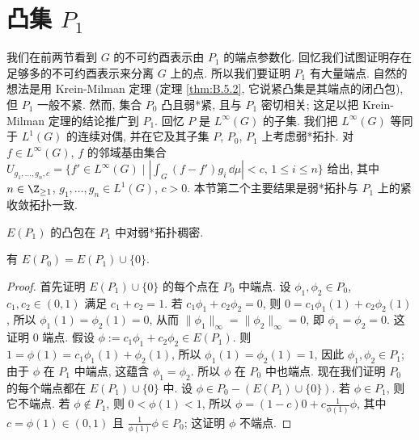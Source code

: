 \section{\texorpdfstring{凸集 $P_1$}{凸集 P1}}
我们在前两节看到 $G$ 的不可约酉表示由 $P_1$ 的端点参数化. 回忆我们试图证明存在足够多的不可约酉表示来分离 $G$ 上的点. 所以我们要证明 $P_1$ 有大量端点. 自然的想法是用 Krein-Milman 定理 (定理 \ref{thm:B.5.2}, 它说紧凸集是其端点的闭凸包), 但 $P_1$ 一般不紧. 然而, 集合 $P_0$ 凸且弱*紧, 且与 $P_1$ 密切相关; 这足以把 Krein-Milman 定理的结论推广到 $P_1$.
回忆 $P$ 是 $L^{\infty}(G)$ 的子集. 我们把 $L^{\infty}(G)$ 等同于 $L^1(G)$ 的连续对偶, 并在它及其子集 $P$, $P_0$, $P_1$ 上考虑弱*拓扑. 对 $f \in L^{\infty}(G)$, $f$ 的邻域基由集合 $U_{g_1,\ldots,g_n,c} = \{f' \in L^{\infty}(G) \mid |\int_G (f - f')g_i\,\dd\mu| < c,\, 1 \leq i \leq n\}$ 给出, 其中 $n \in \Z_{\geq 1}$, $g_1, \ldots, g_n \in L^1(G)$, $c > 0$. 本节第二个主要结果是弱*拓扑与 $P_1$ 上的紧收敛拓扑一致.

\begin{theorem}[$E(P_1)$ 的凸包稠密]
\label{thm:III.4.1}
$E(P_1)$ 的凸包在 $P_1$ 中对弱*拓扑稠密.
\end{theorem}

\begin{lemma}[$E(P_0) = E(P_1) \cup \{0\}$]
\label{lem:III.4.2}
有 $E(P_0) = E(P_1) \cup \{0\}$.
\end{lemma}

\begin{proof}
首先证明 $E(P_1) \cup \{0\}$ 的每个点在 $P_0$ 中端点. 设 $\phi_1, \phi_2 \in P_0$, $c_1, c_2 \in (0, 1)$ 满足 $c_1 + c_2 = 1$. 若 $c_1\phi_1 + c_2\phi_2 = 0$, 则 $0 = c_1\phi_1(1) + c_2\phi_2(1)$, 所以 $\phi_1(1) = \phi_2(1) = 0$, 从而 $\|\phi_1\|_{\infty} = \|\phi_2\|_{\infty} = 0$, 即 $\phi_1 = \phi_2 = 0$. 这证明 $0$ 端点. 假设 $\phi := c_1\phi_1 + c_2\phi_2 \in E(P_1)$. 则 $1 = \phi(1) = c_1\phi_1(1) + \phi_2(1)$, 所以 $\phi_1(1) = \phi_2(1) = 1$, 因此 $\phi_1, \phi_2 \in P_1$; 由于 $\phi$ 在 $P_1$ 中端点, 这蕴含 $\phi_1 = \phi_2$. 所以 $\phi$ 在 $P_0$ 中也端点.
现在我们证明 $P_0$ 的每个端点都在 $E(P_1) \cup \{0\}$ 中. 设 $\phi \in P_0 - (E(P_1) \cup \{0\})$. 若 $\phi \in P_1$, 则它不端点. 若 $\phi \notin P_1$, 则 $0 < \phi(1) < 1$, 所以 $\phi = (1 - c)0 + c\frac{1}{\phi(1)}\phi$, 其中 $c = \phi(1) \in (0, 1)$ 且 $\frac{1}{\phi(1)}\phi \in P_0$; 这证明 $\phi$ 不端点.
\end{proof}

